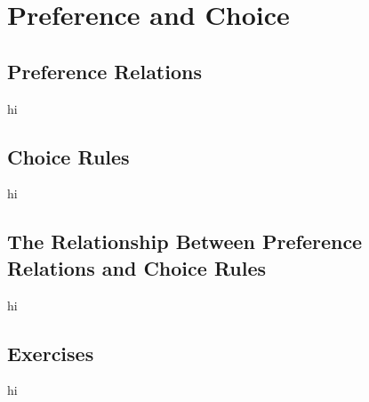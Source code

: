 \chapter{Preference and Choice}
\label{ch:prefchoice}

\section{Preference Relations}
hi
\section{Choice Rules}
hi
\section{The Relationship Between Preference Relations and Choice Rules}
hi
\section{Exercises}
hi